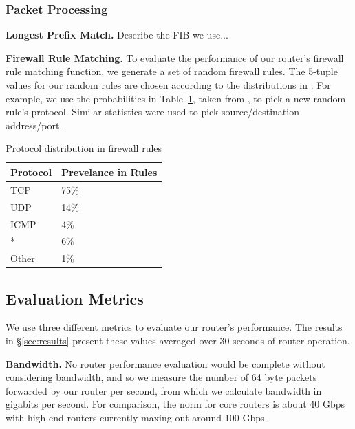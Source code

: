 \subsubsection{Packet Processing}
\label{sec:eval-proc}

\noindent \textbf{Longest Prefix Match.} Describe the FIB we use...\\

\noindent \textbf{Firewall Rule Matching.} To evaluate the performance of our
router's firewall rule matching function, we generate a set of random firewall
rules. The 5-tuple values for our random rules are chosen according to the
distributions in \cite{Rovniagin}. For example, we use the probabilities in
Table~\ref{tab:proto-dist}, taken from \cite{Rovniagin}, to pick a new random
rule's protocol. Similar statistics were used to pick source/destination
address/port.

\begin{table}[htbp]
   \centering
   \begin{tabular}{ l l } 
      \toprule
      \textbf{Protocol}  & \textbf{Prevelance in Rules} \\
      \midrule
	  TCP & 75\% \\
      UDP & 14\% \\
	  ICMP & 4\% \\
	  * & 6\% \\
	  Other & 1\% \\
      \bottomrule
   \end{tabular}
   \caption{Protocol distribution in firewall rules}
   \label{tab:proto-dist}
\end{table}

\subsection{Evaluation Metrics}
\label{sec:metrics}

We use three different metrics to evaluate our router's performance. The results
in \S\ref{sec:results} present these values averaged over 30 seconds of router
operation.

\medskip \noindent \textbf{Bandwidth.} No router performance evaluation would
be complete without considering bandwidth, and so we measure the number of 64
byte packets forwarded by our router per second, from which we calculate
bandwidth in gigabits per second. For comparison, the norm for core routers is
about 40 Gbps with high-end routers currently maxing out around 100 Gbps.

